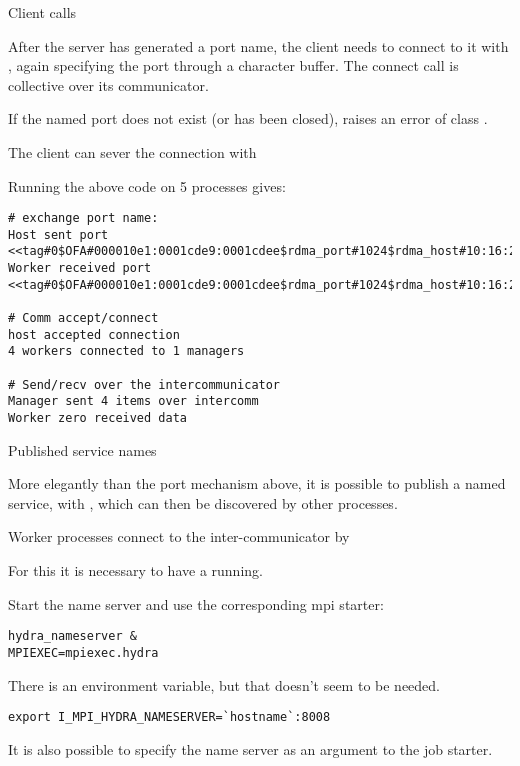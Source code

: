  {Client calls}

After the server has generated a port name, the client 
needs to connect to it with
, again specifying the port through a character buffer.
The connect call is collective over its communicator.


If the named port does not exist (or has been closed),
 raises an error of class .

The client can sever the connection with

Running the above code on 5 processes gives:
\begin{small}
\begin{verbatim}
# exchange port name:
Host sent port <<tag#0$OFA#000010e1:0001cde9:0001cdee$rdma_port#1024$rdma_host#10:16:225:0:1:205:199:254:128:0:0:0:0:0:0$>>
Worker received port <<tag#0$OFA#000010e1:0001cde9:0001cdee$rdma_port#1024$rdma_host#10:16:225:0:1:205:199:254:128:0:0:0:0:0:0$>>

# Comm accept/connect
host accepted connection
4 workers connected to 1 managers

# Send/recv over the intercommunicator
Manager sent 4 items over intercomm
Worker zero received data  
\end{verbatim}
\end{small}

 {Published service names}
\label{sec:mpi-publish}

More elegantly than the port mechanism above,
it is possible to publish a named service, 
with ,
which can then be discovered by other processes.


Worker processes connect to the inter-communicator by


For this it is necessary to have a  running.

\begin{intelnote}
Start the  name server and use the corresponding mpi starter:
\begin{verbatim}
hydra_nameserver &
MPIEXEC=mpiexec.hydra
\end{verbatim}
There is an environment variable, but that doesn't seem to be needed.
\begin{verbatim}
export I_MPI_HYDRA_NAMESERVER=`hostname`:8008
\end{verbatim}
It is also possible to specify the name server as an argument to the job starter.
\end{intelnote}

